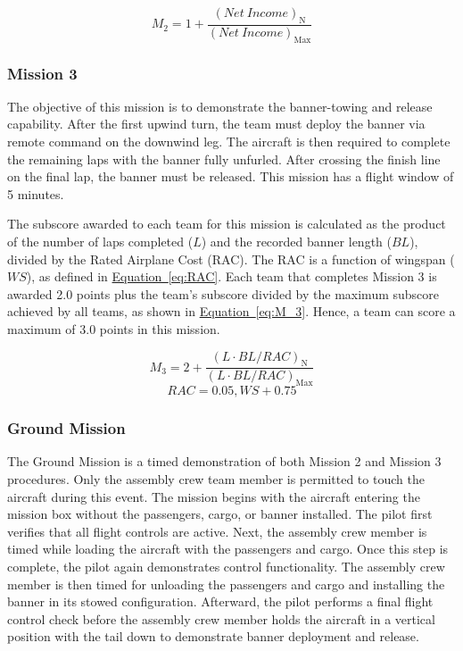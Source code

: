 \documentclass[10pt, letterpaper]{article}
\begin{document}
\begin{equation}
\label{eq:M_2}
M_2 = 1 + \frac{(Net\ Income)_ {\text{N}}}{(Net\ Income)_{\text{Max}}}
\end{equation}

\subsubsection{Mission 3}
The objective of this mission is to demonstrate the banner-towing and release capability. After the first upwind turn, the team must deploy the banner via remote command on the downwind leg. The aircraft is then required to complete the remaining laps with the banner fully unfurled. After crossing the finish line on the final lap, the banner must be released. This mission has a flight window of 5 minutes.

The subscore awarded to each team for this mission is calculated as the product of the number of laps completed ($L$) and the recorded banner length ($BL$), divided by the Rated Airplane Cost (RAC). The RAC is a function of wingspan ($WS$), as defined in \hyperref[eq:RAC]{Equation~\ref*{eq:RAC}}. Each team that completes Mission 3 is awarded 2.0 points plus the team’s subscore divided by the maximum subscore achieved by all teams, as shown in \hyperref[eq:M_3]{Equation~\ref*{eq:M_3}}. Hence, a team can score a maximum of 3.0 points in this mission.

\setlength{\abovedisplayskip}{4pt}
\setlength{\belowdisplayskip}{4pt}

\begin{equation}
\label{eq:M_3}
M_3 = 2 + \frac{(L \cdot BL / RAC)_ {\text{N}}}{(L \cdot BL / RAC)_{\text{Max}}}
\end{equation}
\begin{equation}
\label{eq:RAC}
RAC = 0.05,WS + 0.75
\end{equation}

\subsubsection{Ground Mission}
The Ground Mission is a timed demonstration of both Mission 2 and Mission 3 procedures. Only the assembly crew team member is permitted to touch the aircraft during this event. The mission begins with the aircraft entering the mission box without the passengers, cargo, or banner installed. The pilot first verifies that all flight controls are active. Next, the assembly crew member is timed while loading the aircraft with the passengers and cargo. Once this step is complete, the pilot again demonstrates control functionality. The assembly crew member is then timed for unloading the passengers and cargo and installing the banner in its stowed configuration. Afterward, the pilot performs a final flight control check before the assembly crew member holds the aircraft in a vertical position with the tail down to demonstrate banner deployment and release.
\end{document}
